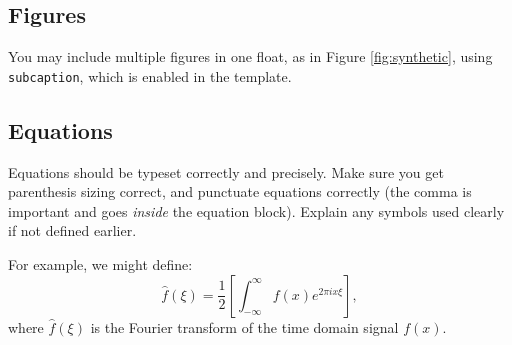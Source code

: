 \documentclass{l4proj}
\begin{document}
\subsection{Figures}
You may include multiple figures in one float, as in Figure \ref{fig:synthetic}, using \texttt{subcaption}, which is enabled in the template.




\clearpage

\subsection{Equations}

Equations should be typeset correctly and precisely. Make sure you get parenthesis sizing correct, and punctuate equations correctly 
(the comma is important and goes \textit{inside} the equation block). Explain any symbols used clearly if not defined earlier. 

For example, we might define:
\begin{equation}
    \hat{f}(\xi) = \frac{1}{2}\left[ \int_{-\infty}^{\infty} f(x) e^{2\pi i x \xi} \right],
\end{equation}    
where $\hat{f}(\xi)$ is the Fourier transform of the time domain signal $f(x)$.
\end{document}
